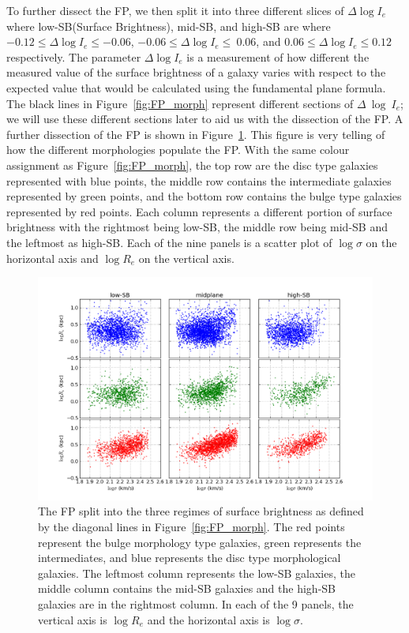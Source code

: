 \documentclass[showcase, preprintnumbers, amsmath, amssymb, bibnotes, 12pt]{revtex4}
\begin{document}
To further dissect the FP, we then split it into three different slices of $\Delta\log{I_e}$ where low-SB(Surface Brightness), mid-SB, and high-SB are where $-0.12\leq\Delta\log{I_e}\leq-0.06$, $-0.06\leq\Delta\log{I_e}\leq~0.06$, and $0.06\leq\Delta\log{I_e}\leq0.12$ respectively. The parameter $\Delta\log{I_e}$ is a measurement of how different the measured value of the surface brightness of a galaxy varies with respect to the expected value that would be calculated using the fundamental plane formula. The black lines in Figure~\ref{fig:FP_morph} represent different sections of $\Delta~\log~I_e$; we will use these different sections later to aid us with the dissection of the FP. A further dissection of the FP is shown in Figure~\ref{fig:FP_split_morph}. This figure is very telling of how the different morphologies populate the FP. With the same colour assignment as Figure~\ref{fig:FP_morph}, the top row are the disc type galaxies represented with blue points, the middle row contains the intermediate galaxies represented by green points, and the bottom row contains the bulge type galaxies represented by red points. Each column represents a different portion of surface brightness with the rightmost being low-SB, the middle row being mid-SB and the leftmost as high-SB. Each of the nine panels is a scatter plot of $\log{\sigma}$ on the horizontal axis and $\log{R_e}$ on the vertical axis. 

\begin{figure}
\begin{center}
\includegraphics[scale=0.63]{FP_split_morph.png}
\end{center}
\caption{The FP split into the three regimes of surface brightness as defined by the diagonal lines in Figure~\ref{fig:FP_morph}. The red points represent the bulge morphology type galaxies, green represents the intermediates, and blue represents the disc type morphological galaxies. The leftmost column represents the low-SB galaxies, the middle column contains the mid-SB galaxies and the high-SB galaxies are in the rightmost column. In each of the 9 panels, the vertical axis is $\log{R_e}$ and the horizontal axis is $\log{\sigma}$.  \label{fig:FP_split_morph}} 
\end{figure}
\end{document}

